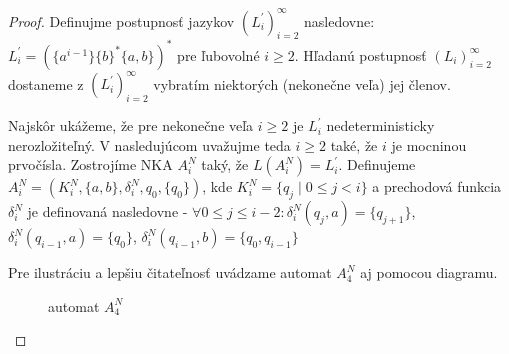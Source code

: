 \begin{proof}
Definujme postupnosť jazykov $ (L^{\prime}_i)_{i=2}^{\infty} $ nasledovne: $ L^{\prime}_i = (\lbrace a^{i-1} \rbrace \lbrace b \rbrace^* \lbrace a,b \rbrace)^* $ pre ľubovolné $ i \geq 2 $. Hľadanú postupnosť $ (L_i)_{i=2}^{\infty} $ dostaneme z $ (L^{\prime}_i)_{i=2}^{\infty} $ vybratím niektorých (nekonečne veľa) jej členov.
\par
Najskôr ukážeme, že pre nekonečne veľa $ i \geq 2 $ je $ L^{\prime}_i $ nedeterministicky nerozložiteľný. V nasledujúcom uvažujme teda $ i \geq 2 $ také, že $ i $ je mocninou prvočísla. Zostrojíme NKA $ A_i^N $ taký, že $ L(A_i^N) = L^{\prime}_i $. Definujeme $ A_i^N = (K_i^N, \lbrace a,b \rbrace, \delta_i^N,q_0,\lbrace q_0 \rbrace) $, kde $ K_i^N = \lbrace q_j \; | \; 0 \leq j < i \rbrace $ a prechodová funkcia $ \delta_i^N $ je definovaná nasledovne - $ \forall 0 \leq j \leq i-2: \delta_i^N(q_j,a) = \lbrace q_{j+1} \rbrace $, $ \delta_i^N(q_{i-1},a)=\lbrace q_0 \rbrace  $, $ \delta_i^N(q_{i-1},b)=\lbrace q_0,q_{i-1} \rbrace  $

Pre ilustráciu a lepšiu čitateľnosť uvádzame automat $ A_4^N $ aj pomocou diagramu.

\begin{figure}[H]
\centering
{}
\caption{automat $ A_4^N $}
\end{figure}


\end{proof}
